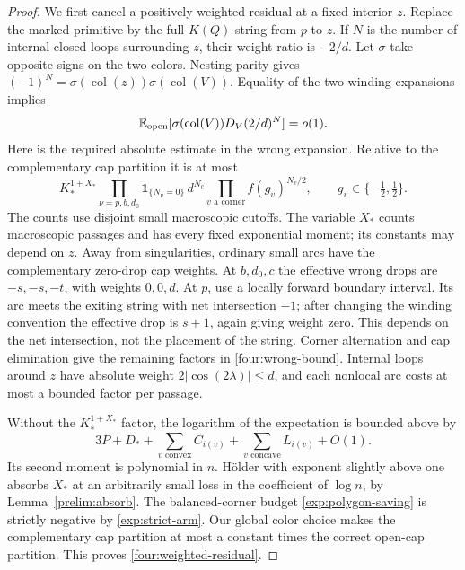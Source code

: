 \begin{proof}
We first cancel a positively weighted residual at a fixed interior $z$.
Replace the marked primitive by the full $K(Q)$ string from $p$ to $z$.
If $N$ is the number of internal closed loops surrounding $z$, their
weight ratio is $-2/d$.  Let $\sigma$ take opposite signs on the two
colors.  Nesting parity gives
$(-1)^N=\sigma(\operatorname{col}(z))\sigma(\operatorname{col}(V))$.
Equality of the two winding expansions implies
\begin{equation}
 \mathbb E_{\rm open}
       [\sigma(\operatorname{col}(V))D_V(2/d)^N]=o(1).
 \label{four:weighted-residual}
\end{equation}
Here is the required absolute estimate in the wrong expansion.
Relative to the complementary cap partition it is at most
\begin{equation}
 K_*^{1+X_*}
 \prod_{\nu=p,b,d_0}\mathbf1_{\{N_\nu=0\}}\,
 d^{N_c}\prod_{v\text{ a corner}}f(g_v)^{N_v/2},
 \qquad g_v\in\{-\tfrac12,\tfrac12\}.
 \label{four:wrong-bound}
\end{equation}
The counts use disjoint small macroscopic cutoffs.  The variable $X_*$
counts macroscopic passages and has every fixed exponential moment;
its constants may depend on $z$.  Away from singularities, ordinary
small arcs have the complementary zero-drop cap weights.  At $b,d_0,c$
the effective wrong drops are $-s,-s,-t$, with weights $0,0,d$.
At $p$, use a locally forward boundary interval.  Its arc meets the
exiting string with net intersection $-1$; after changing the winding
convention the effective drop is $s+1$, again giving weight zero.
This depends on the net intersection, not the placement of the string.
Corner alternation and cap elimination give the remaining factors in
\eqref{four:wrong-bound}.  Internal loops around $z$ have absolute
weight $2|\cos(2\lambda)|\le d$, and each nonlocal arc costs at most
a bounded factor per passage.

Without the $K_*^{1+X_*}$ factor, the logarithm of the expectation is
bounded above by
\begin{equation}
 3P+D_*+\sum_{v\text{ convex}}C_{i(v)}
          +\sum_{v\text{ concave}}L_{i(v)}+O(1).
 \label{four:residual-budget}
\end{equation}
Its second moment is polynomial in $n$.  H\"older with exponent slightly
above one absorbs $X_*$ at an arbitrarily small loss in the coefficient
of $\log n$, by Lemma~\ref{prelim:absorb}.  The balanced-corner budget
\eqref{exp:polygon-saving} is strictly negative by
\eqref{exp:strict-arm}.  Our global color choice makes the complementary
cap partition at most a constant times the correct open-cap partition.
This proves \eqref{four:weighted-residual}.


\end{proof}
